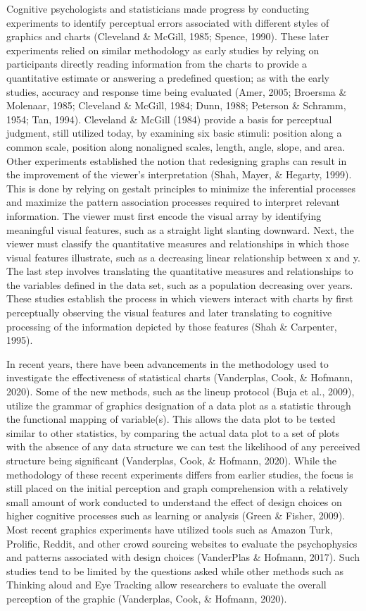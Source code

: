 \documentclass[print]{nuthesis}
\begin{document}
Cognitive psychologists and statisticians made progress by conducting experiments to identify perceptual errors associated with different styles of graphics and charts (Cleveland \& McGill, 1985; Spence, 1990).
These later experiments relied on similar methodology as early studies by relying on participants directly reading information from the charts to provide a quantitative estimate or answering a predefined question; as with the early studies, accuracy and response time being evaluated (Amer, 2005; Broersma \& Molenaar, 1985; Cleveland \& McGill, 1984; Dunn, 1988; Peterson \& Schramm, 1954; Tan, 1994).
Cleveland \& McGill (1984) provide a basis for perceptual judgment, still utilized today, by examining six basic stimuli: position along a common scale, position along nonaligned scales, length, angle, slope, and area.
Other experiments established the notion that redesigning graphs can result in the improvement of the viewer's interpretation (Shah, Mayer, \& Hegarty, 1999).
This is done by relying on gestalt principles to minimize the inferential processes and maximize the pattern association processes required to interpret relevant information.
The viewer must first encode the visual array by identifying meaningful visual features, such as a straight light slanting downward.
Next, the viewer must classify the quantitative measures and relationships in which those visual features illustrate, such as a decreasing linear relationship between x and y.
The last step involves translating the quantitative measures and relationships to the variables defined in the data set, such as a population decreasing over years.
These studies establish the process in which viewers interact with charts by first perceptually observing the visual features and later translating to cognitive processing of the information depicted by those features (Shah \& Carpenter, 1995).

In recent years, there have been advancements in the methodology used to investigate the effectiveness of statistical charts (Vanderplas, Cook, \& Hofmann, 2020).
Some of the new methods, such as the lineup protocol (Buja et al., 2009), utilize the grammar of graphics designation of a data plot as a statistic through the functional mapping of variable(s).
This allows the data plot to be tested similar to other statistics, by comparing the actual data plot to a set of plots with the absence of any data structure we can test the likelihood of any perceived structure being significant (Vanderplas, Cook, \& Hofmann, 2020).
While the methodology of these recent experiments differs from earlier studies, the focus is still placed on the initial perception and graph comprehension with a relatively small amount of work conducted to understand the effect of design choices on higher cognitive processes such as learning or analysis (Green \& Fisher, 2009).
Most recent graphics experiments have utilized tools such as Amazon Turk, Prolific, Reddit, and other crowd sourcing websites to evaluate the psychophysics and patterns associated with design choices (VanderPlas \& Hofmann, 2017). Such studies tend to be limited by the questions asked while other methods such as Thinking aloud and Eye Tracking allow researchers to evaluate the overall perception of the graphic (Vanderplas, Cook, \& Hofmann, 2020).
\end{document}
